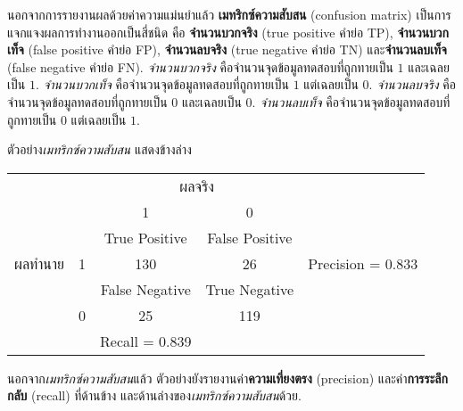 \begin{Exercise}
นอกจากการรายงานผลด้วยค่าความแม่นยำแล้ว
\textbf{เมทริกซ์ความสับสน} (confusion matrix)
%
เป็นการแจกแจงผลการทำงานออกเป็นสี่ชนิด
คือ \textbf{จำนวนบวกจริง} (true positive คำย่อ TP),
\textbf{จำนวนบวกเท็จ} (false positive คำย่อ FP),
\textbf{จำนวนลบจริง} (true negative คำย่อ TN)
และ\textbf{จำนวนลบเท็จ} (false negative คำย่อ FN).
\textit{จำนวนบวกจริง}
คือจำนวนจุดข้อมูลทดสอบที่ถูกทายเป็น $1$
และเฉลยเป็น $1$.
\textit{จำนวนบวกเท็จ}
คือจำนวนจุดข้อมูลทดสอบที่ถูกทายเป็น $1$
แต่เฉลยเป็น $0$.
\textit{จำนวนลบจริง}
คือจำนวนจุดข้อมูลทดสอบที่ถูกทายเป็น $0$
และเฉลยเป็น $0$.
\textit{จำนวนลบเท็จ}
คือจำนวนจุดข้อมูลทดสอบที่ถูกทายเป็น $0$
แต่เฉลยเป็น $1$.


ตัวอย่าง\textit{เมทริกซ์ความสับสน}
แสดงข้างล่าง
\\

\begin{center}
\begin{tabular}{ccccc}
	
	&       & \multicolumn{2}{c}{ผลจริง} & \\
	&       & 1              &   0      & \\
	\cline{3-4}        
	&       & \multicolumn{1}{|c}{True Positive} & \multicolumn{1}{|c|}{False Positive} &  \\
	ผลทำนาย   &     1 & \multicolumn{1}{|c}{130} & \multicolumn{1}{|c|}{26} & Precision = 0.833 \\
	\cline{3-4}
	&      & \multicolumn{1}{|c}{False Negative} & \multicolumn{1}{|c|}{True Negative} & \\
	&     0 & \multicolumn{1}{|c}{25} & \multicolumn{1}{|c|}{119} & \\         
	\cline{3-4}
	&       & Recall = 0.839 &               &
\end{tabular} 
\end{center}

นอกจาก\textit{เมทริกซ์ความสับสน}แล้ว
ตัวอย่างยังรายงานค่า\textbf{ความเที่ยงตรง} (precision) และค่า\textbf{การระลึกกลับ} (recall)
ที่ด้านข้าง และด้านล่างของ\textit{เมทริกซ์ความสับสน}ด้วย.


\end{Exercise}
